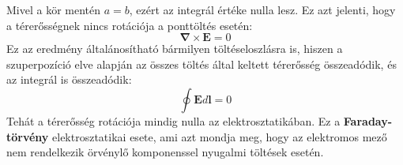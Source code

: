 \documentclass[../main.tex]{subfiles}
\begin{document}
Mivel a kör mentén $a = b$, ezért az integrál értéke nulla lesz. Ez azt jelenti, hogy a térerősségnek nincs rotációja a ponttöltés esetén:
\begin{equation}
    \boxed{\boldsymbol{\nabla} \times \mathbf{E} = 0}
\end{equation}
Ez az eredmény általánosítható bármilyen töltéseloszlásra is, hiszen a szuperpozíció elve alapján az összes töltés által keltett térerősség összeadódik, és az integrál is összeadódik:
\begin{equation}
    \oint \mathbf{E} d\mathbf{l} = 0
\end{equation}
Tehát a térerősség rotációja mindig nulla az elektrosztatikában. Ez a \textbf{Faraday-törvény} elektrosztatikai esete, ami azt mondja meg, hogy az elektromos mező nem rendelkezik örvénylő komponenssel nyugalmi töltések esetén.
\end{document}
